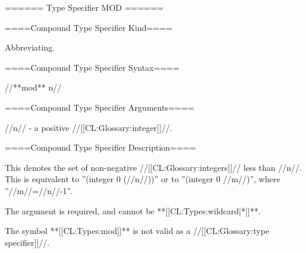 ====== Type Specifier MOD ======

====Compound Type Specifier Kind====

Abbreviating.

====Compound Type Specifier Syntax====

//**mod** n//

====Compound Type Specifier Arguments====

//n// - a positive //[[CL:Glossary:integer]]//.

====Compound Type Specifier Description====

This denotes the set of non-negative //[[CL:Glossary:integers]]// less than //n//. This is equivalent to ''(integer 0 (//n//))'' or to ''(integer 0 //m//)'', where ''//m//=//n//-1''.

The argument is required, and cannot be **[[CL:Types:wildcard|*]]**.

The symbol **[[CL:Types:mod]]** is not valid as a //[[CL:Glossary:type specifier]]//.

